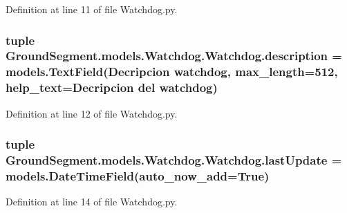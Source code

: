 Definition at line 11 of file Watchdog.\+py.

\hypertarget{class_ground_segment_1_1models_1_1_watchdog_1_1_watchdog_ab6bf4dee4015f39a9c62850ee3ca830e}{}
\subsubsection[{description}]{\setlength{\rightskip}{0pt plus 5cm}tuple Ground\+Segment.\+models.\+Watchdog.\+Watchdog.\+description = models.\+Text\+Field(\textquotesingle{}Decripcion watchdog\textquotesingle{}, max\+\_\+length=512, help\+\_\+text=\textquotesingle{}Decripcion del watchdog\textquotesingle{})\hspace{0.3cm}{\ttfamily [static]}}\label{class_ground_segment_1_1models_1_1_watchdog_1_1_watchdog_ab6bf4dee4015f39a9c62850ee3ca830e}


Definition at line 12 of file Watchdog.\+py.

\hypertarget{class_ground_segment_1_1models_1_1_watchdog_1_1_watchdog_ac6ffa32a8b52ba04c20b99b0e4567bd5}{}
\subsubsection[{last\+Update}]{\setlength{\rightskip}{0pt plus 5cm}tuple Ground\+Segment.\+models.\+Watchdog.\+Watchdog.\+last\+Update = models.\+Date\+Time\+Field(auto\+\_\+now\+\_\+add=True)\hspace{0.3cm}{\ttfamily [static]}}\label{class_ground_segment_1_1models_1_1_watchdog_1_1_watchdog_ac6ffa32a8b52ba04c20b99b0e4567bd5}


Definition at line 14 of file Watchdog.\+py.

\hypertarget{class_ground_segment_1_1models_1_1_watchdog_1_1_watchdog_a1c3ed2ac40ff216074da715ad3f5eb8a}{}
